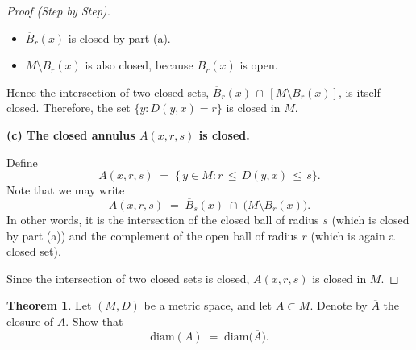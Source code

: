 \documentclass[12pt]{article}
\theoremstyle{definition} %
\newtheorem{theorem}{Theorem}
\theoremstyle{plain} %
\begin{document}
\begin{proof}[Proof (Step by Step)]
                        \begin{itemize}
                        \item $\overline{B}_r(x)$ is closed by part (a).  
                        \item $M \setminus B_r(x)$ is also closed, because $B_r(x)$ is open.  
                        \end{itemize}
                        
                        Hence the intersection of two closed sets, $\overline{B}_r(x)\,\cap\,[M \setminus B_r(x)]$, is itself closed.  
                        Therefore, the set $\{y : D(y,x) = r\}$ is closed in $M$.
                        
                        \medskip
                        
                        \textbf{(c) The closed annulus $A(x,r,s)$ is closed.}
                        
                        Define
                        \[
                        A(x,r,s) \;=\; \{\,y \in M : r \,\le\, D(y,x) \,\le\, s\}.
                        \]
                        Note that we may write
                        \[
                        A(x,r,s)
                        \;=\;
                        \overline{B}_s(x) 
                        \;\cap\; 
                        \bigl(M \setminus B_r(x)\bigr).
                        \]
                        In other words, it is the intersection of the closed ball of radius $s$ (which is closed by part (a)) and the complement of the open ball of radius $r$ (which is again a closed set).  
                        
                        Since the intersection of two closed sets is closed, $A(x,r,s)$ is closed in $M$.  
                        \end{proof}
                        \begin{theorem}
                            Let $(M,D)$ be a metric space, and let $A \subset M$. Denote by $\overline{A}$ the closure of $A$. 
                            Show that 
                            \[
                            \mathrm{diam}(A) \;=\; \mathrm{diam}\bigl(\overline{A}\bigr).
                            \]
                            \end{theorem}
                            
\end{document}
